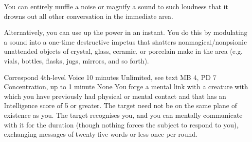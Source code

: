 You can entirely muffle a noise or magnify a sound to such
loudness that it drowns out all other conversation in the
immediate area.

Alternatively, you can use up the power in an instant. You
do this by modulating a sound into a one-time destructive
impetus that shatters nonmagical/nonpsionic unattended objects
of crystal, glass, ceramic, or porcelain make in the area
(e.g. vials, bottles, flasks, jugs, mirrors, and so forth).

\DndPowerHeader%
    {Correspond\label{pwr:correspond}}
    {4th-level Voice}
    {10 minutes}
    {Unlimited, see text}
    {MB 4, PD 7}
    {Concentration, up to 1 minute}
    {None}
You forge a mental link with a creature with
which you have previously had physical or mental contact and
that has an Intelligence score of 5 or greater.
The target need not be on the same plane of existence as you.
The target recognises you, and you can mentally
communicate with it for
the duration (though nothing forces the subject to respond
to you), exchanging messages of twenty-five words or less
once per round.

